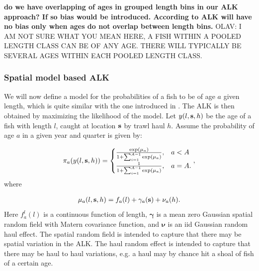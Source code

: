 \documentclass[a4paper 12pt]{article}
\numberwithin{equation}{section}
\begin{document}
 {\bf do we have overlapping of ages in grouped length bins in our ALK approach? If so bias would be introduced. According to \citet{westrheim1978bias} ALK will have no bias only when ages do not overlap between length bins.} OLAV: I AM NOT SURE WHAT YOU MEAN HERE, A FISH WITHIN A POOLED LENGTH CLASS CAN BE OF ANY AGE. THERE WILL TYPICALLY BE SEVERAL AGES WITHIN EACH POOLED LENGTH CLASS.




\subsubsection*{Spatial model based ALK}
\label{sec:spatialModelALK}
We will now define a model for the probabilities of a fish to be of age $a$ given length, which is quite similar with the one introduced in \citep{berg2012spatial}. The ALK is then obtained by maximizing the likelihood of the model. Let $y(l,{\bf s},h)$ be the age of a fish with length $l$, caught at location ${\bf s}$ by trawl haul $h$. Assume the probability of age $a$ in a given year and quarter is given by:

\begin{align}
\pi_a(y(l,{\bf s},h)) =
\begin{cases}
\frac{\exp(\mu_a)}{1+ \sum_{i = 1}^{A-1} \exp(\mu_a)} ,& a<A \\
\frac{1}{1+ \sum_{i = 1}^{A-1} \exp(\mu_a)},& a=A.
\end{cases},
\end{align}
where 

\begin{align}\label{eq:linearPred}
\mu_a(l,{\bf s},h) = f_a(l)  + \gamma_a({\bf s}) + \nu_a(h).
\end{align}
Here $ f_a^l(l)$ is a continuous function of length, $\pmb{\gamma}$ is a mean zero Gaussian spatial random field with Matern covariance function, and $\pmb{\nu}$ is an iid Gaussian random haul effect. The spatial random field is intended to capture that there may be spatial variation in the ALK. The haul random effect is intended to capture that there may be haul to haul variations, e.g. a haul may by chance hit a shoal of fish of a certain age.  
\end{document}
